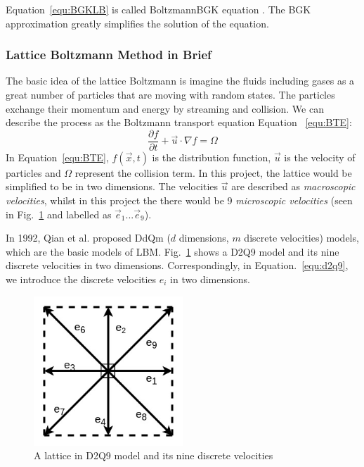 Equation~\ref{equ:BGKLB} is called Boltzmann\-BGK equation \cite{chew1956boltzmann}. The BGK approximation greatly simplifies the solution of the equation.

\subsubsection{Lattice Boltzmann Method in Brief} \label{sec:lbmb}
The basic idea of the lattice Boltzmann is imagine the fluids including gases as a great number of particles that are moving with random states. The particles exchange their momentum and energy by streaming and collision. We can describe the process as the Boltzmann transport equation Equation ~\ref{equ:BTE}:
\begin{equation}
\label{equ:BTE}
    \frac{\partial f}{\partial t} + \vec{u}\cdot \nabla f = \Omega
\end{equation}
In Equation~\ref{equ:BTE}, $f(\vec{x}, t)$ is the distribution function, $\vec{u}$ is the velocity of particles and $\Omega$ represent the collision term. In this project, the lattice would be simplified to be in two dimensions. The velocities $\vec{u}$ are described as \textit{macroscopic velocities}, whilst in this project the there would be 9 \textit{microscopic velocities} (seen in Fig.~\ref{fig:d2q9} and labelled as $\vec{e}_1...\vec{e}_9$). 

In 1992, Qian et al. \cite{d2q9} proposed DdQm ($d$ dimensions, $m$ discrete velocities) models, which are the basic models of LBM. Fig.~\ref{fig:d2q9} shows a D2Q9 model and its nine discrete velocities in two dimensions. Correspondingly, in Equation.~\ref{equ:d2q9}, we introduce the discrete velocities $e_i$ in two dimensions.



\begin{figure}[!tb]
   \centering
       \includegraphics[width=0.5\textwidth]{figures/nine_direction.jpg}
       \caption{A lattice in D2Q9 model and its nine discrete velocities}
       \label{fig:d2q9}
\end{figure}


